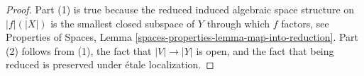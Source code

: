\documentclass[10pt,a4paper]{amsart}
\theoremstyle{plain}
\theoremstyle{definition}
\theoremstyle{remark}
\numberwithin{equation}{subsection}
\begin{document}
\begin{proof}
Part (1) is true because the reduced induced algebraic space structure on
$\overline{|f|(|X|)}$ is the smallest closed subspace
of $Y$ through which $f$ factors, see
Properties of Spaces, Lemma \ref{spaces-properties-lemma-map-into-reduction}.
Part (2) follows from (1), the fact that $|V| \to |Y|$ is open, and the
fact that being reduced is preserved under \'etale localization.
\end{proof}
\end{document}
